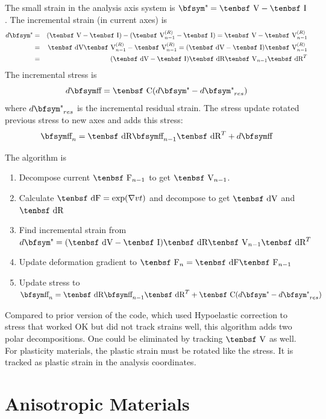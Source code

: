 \documentclass[11pt]{book}
\def\C{\hbox{\tenbsf C}}
\def\F{\hbox{\tenbsf F}}
\def\dF{\hbox{\tenbsf dF}}
\def\I{\hbox{\tenbsf I}}
\def\dR{\hbox{\tenbsf dR}}
\def\V{\hbox{\tenbsf V}}
\def\dV{\hbox{\tenbsf dV}}
\def\st{{\hbox{\bfsym\char'033}}}
\def\et{{\hbox{\bfsym\char'042}}}
\begin{document}
The small strain in the analysis axis system is $\et = \V -\I$. The incremental strain (in current axes) is
\begin{eqnarray}
    d\et & = & (\V -\I) - ( \V_{n-1}^{(R)} -\I) = \V -  \V_{n-1}^{(R)} \\
       & = & \dV \V_{n-1}^{(R)} -  \V_{n-1}^{(R)} = (\dV-\I) \V_{n-1}^{(R)} \\
       & = & (\dV-\I) \dR \V_{n-1} \dR^T
\end{eqnarray}
The incremental stress is
\begin{equation}
   d\st =  \C(d\et - d\et_{res})
\end{equation}
where $d\et_{res}$ is the incremental residual strain. The stress update rotated previous stress to new axes and adds this stress:
\begin{equation}
   \st_n =  \dR \st_{n-1} \dR^T +  d\st 
\end{equation}

The algorithm is
\begin{enumerate}
\item Decompose current $\F_{n-1}$ to get $\V_{n-1}$.
\item Calculate $\dF = \exp(\nabla v t)$ and decompose to get $\dV$ and $\dR$
\item Find incremental strain from $d\et=(\dV-\I) \dR \V_{n-1} \dR^T$
\item Update deformation gradient to $\F_n = \dF \F_{n-1}$
\item Update stress to $\st_n =  \dR \st_{n-1} \dR^T  +  \C(d\et - d\et_{res})$
\end{enumerate}
Compared to prior version  of the code, which used Hypoelastic correction to stress that worked OK but did not track strains well, this algorithm adds two polar decompositions. One could be eliminated by tracking $\V$ as well. For plasticity materials, the plastic strain must be rotated like the stress. It is tracked as plastic strain in the analysis coordinates.

\section{Anisotropic Materials}
\end{document}
